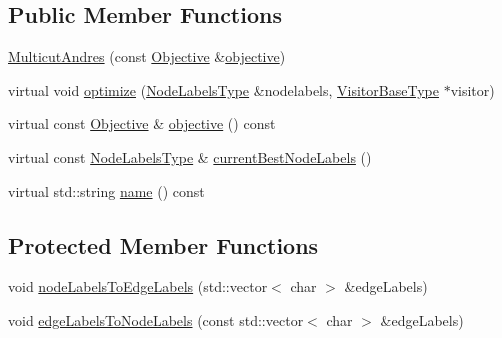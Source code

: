 \subsection*{Public Member Functions}
\begin{DoxyCompactItemize}
\item 
\hyperlink{classnifty_1_1graph_1_1optimization_1_1multicut_1_1MulticutAndres_ae6d72673d50afe1faa2c3dc99ba92210}{Multicut\+Andres} (const \hyperlink{classnifty_1_1graph_1_1optimization_1_1multicut_1_1MulticutAndres_ac2d2044ef4dc45dbacdb3f34b001760f}{Objective} \&\hyperlink{classnifty_1_1graph_1_1optimization_1_1multicut_1_1MulticutAndres_a7498ff1c88845f4f181e2fd558b6ce50}{objective})
\item 
virtual void \hyperlink{classnifty_1_1graph_1_1optimization_1_1multicut_1_1MulticutAndres_a476f4451db459f72c3f007387a65da8f}{optimize} (\hyperlink{classnifty_1_1graph_1_1optimization_1_1multicut_1_1MulticutAndres_aebe9bae6ca2760f72e19ec62504de209}{Node\+Labels\+Type} \&nodelabels, \hyperlink{classnifty_1_1graph_1_1optimization_1_1multicut_1_1MulticutAndres_a2d78bb58be29b7d46e9c653489a6d1de}{Visitor\+Base\+Type} $\ast$visitor)
\item 
virtual const \hyperlink{classnifty_1_1graph_1_1optimization_1_1multicut_1_1MulticutAndres_ac2d2044ef4dc45dbacdb3f34b001760f}{Objective} \& \hyperlink{classnifty_1_1graph_1_1optimization_1_1multicut_1_1MulticutAndres_a7498ff1c88845f4f181e2fd558b6ce50}{objective} () const 
\item 
virtual const \hyperlink{classnifty_1_1graph_1_1optimization_1_1multicut_1_1MulticutAndres_aebe9bae6ca2760f72e19ec62504de209}{Node\+Labels\+Type} \& \hyperlink{classnifty_1_1graph_1_1optimization_1_1multicut_1_1MulticutAndres_a61b22d0ac4f49d902d0be6ef63d25228}{current\+Best\+Node\+Labels} ()
\item 
virtual std\+::string \hyperlink{classnifty_1_1graph_1_1optimization_1_1multicut_1_1MulticutAndres_abb278afaf07df93712033694ca13f846}{name} () const 
\end{DoxyCompactItemize}
\subsection*{Protected Member Functions}
\begin{DoxyCompactItemize}
\item 
void \hyperlink{classnifty_1_1graph_1_1optimization_1_1multicut_1_1MulticutAndres_acb3a9d513a465e8109b4700d4465086c}{node\+Labels\+To\+Edge\+Labels} (std\+::vector$<$ char $>$ \&edge\+Labels)
\item 
void \hyperlink{classnifty_1_1graph_1_1optimization_1_1multicut_1_1MulticutAndres_a8a7666fececb09d893acac9975713b25}{edge\+Labels\+To\+Node\+Labels} (const std\+::vector$<$ char $>$ \&edge\+Labels)
\end{DoxyCompactItemize}
